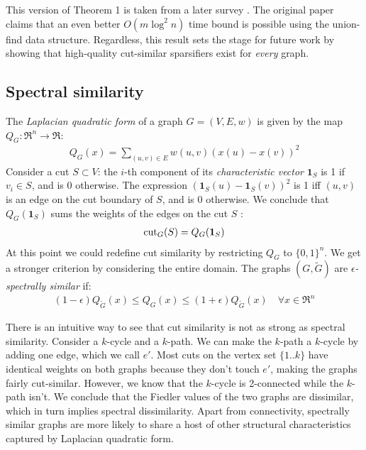 \documentclass{article}
\begin{document}
This version of Theorem 1 is taken from a later survey \cite{TheSurvey}. The
original paper claims that an even better $O(m\log^2 n)$ time bound is
possible using the union-find data structure. Regardless, this result sets
the stage for future work by showing that high-quality cut-similar
sparsifiers exist for \textit{every} graph. 

\subsection{Spectral similarity}

The \textit{Laplacian quadratic form} of a graph $G = (V, E, w)$ is given by
the map $Q_G : \Re^n \rightarrow \Re$:
\begin{align*}
    Q_G(x) = \sum_{(u, v) \in E} w(u, v)(x(u) - x(v))^2
\end{align*}
Consider a cut $S \subset V$: the $i$-th component of its
\textit{characteristic vector} $\mathbf{1}_S$ is 1 if $v_i \in S$, and is 0
otherwise. The expression $(\mathbf{1}_S(u) - \mathbf{1}_S(v))^2$ is 1 iff
$(u, v)$ is an edge on the cut boundary of $S$, and is 0 otherwise. We
conclude that $Q_G(\mathbf{1}_S)$ sums the weights of the edges on the cut
$S$ \cite{TheSurvey}:
\begin{align*}
    \text{cut}_{G}(S) = Q_G(\mathbf{1}_S)
\end{align*}
At this point we could redefine cut similarity by restricting $Q_G$ to $\{0,
1\}^n$. We get a stronger criterion by considering the entire domain.  The
graphs $(G, \tilde{G})$ are \textit{$\epsilon$-spectrally similar} if:
\begin{align*}
    (1 - \epsilon)Q_{\tilde{G}}(x) \leq Q_G(x) \leq (1 +
    \epsilon)Q_{\tilde{G}}(x) \quad \forall{x \in \Re^n}
\end{align*}

There is an intuitive way to see that cut similarity is not as strong as
spectral similarity. Consider a $k$-cycle and a $k$-path. We can make the
$k$-path a $k$-cycle by adding one edge, which we call $e'$. Most cuts on
the vertex set $\{1..k\}$ have identical weights on both graphs because they
don't touch $e'$, making the graphs fairly cut-similar. However, we know
that the $k$-cycle is 2-connected while the $k$-path isn't. We conclude that
the Fiedler values of the two graphs are dissimilar, which in turn implies
spectral dissimilarity. Apart from connectivity, spectrally similar graphs
are more likely to share a host of other structural characteristics captured
by Laplacian quadratic form.
\end{document}
